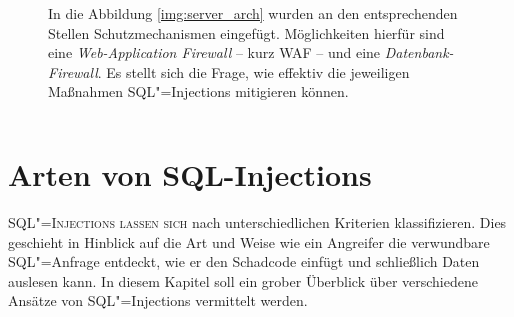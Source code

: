 \begin{figure}[htbp!]
\begin{margincap}
\centering
{}
\caption{In die Abbildung \ref{img:server_arch} wurden an den entsprechenden Stellen Schutzmechanismen eingefügt. Möglichkeiten hierfür sind eine \emph{Web-Application Firewall} -- kurz WAF -- und eine \emph{Datenbank-Firewall}. Es stellt sich die Frage, wie effektiv die jeweiligen Maßnahmen SQL"=Injections mitigieren können.}
\label{img:protected_server_arch}
\end{margincap}
\end{figure}



\begin{listing}
\begin{margincap}
\inputminted[startinline]{php}{imports/selfmade_waf.php}
\caption[login]{ }
\label{lst:selfmade_waf}
\end{margincap}
\end{listing}












\chapter{Arten von SQL-Injections}
\lettrine[lines=2]{S}{QL"=Injections lassen sich}  nach unterschiedlichen Kriterien klassifizieren. Dies geschieht in Hinblick auf die Art und Weise wie ein Angreifer die verwundbare SQL"=Anfrage entdeckt, wie er den Schadcode einfügt und schließlich Daten auslesen kann. In diesem Kapitel soll ein grober Überblick über verschiedene Ansätze von SQL"=Injections vermittelt werden.

